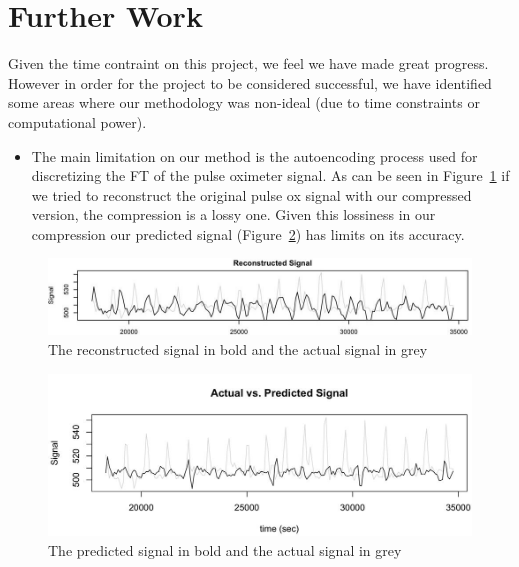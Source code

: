 \documentclass[12pt]{article}
\begin{document}
 \section{Further Work}
  Given the time contraint on this project, we feel we have made great progress.
 However in order for the project to be considered successful, we have identified some areas where our methodology was non-ideal (due to time constraints or computational power).
 \begin{itemize}
 \item{The main limitation on our method is the autoencoding process used for discretizing the FT of the pulse oximeter signal. As can be seen in Figure~\ref{figure:reconst} if we tried to reconstruct the original pulse ox signal with our compressed version, the compression is a lossy one. Given this lossiness in our compression our predicted signal (Figure~\ref{figure:pred}) has limits on its accuracy.}

 
 \end{itemize}
 
 \begin{figure}
\captionsetup{justification=centering}
\includegraphics[width=\textwidth]{images/reconst_signal.jpg}
\caption{The reconstructed signal in bold and the actual signal in grey \label{figure:reconst}}
\end{figure}
 \begin{figure}
\captionsetup{justification=centering}
\includegraphics[width=\textwidth]{images/actual_vs_pred_signal.jpg}
\caption{The predicted signal in bold and the actual signal in grey \label{figure:pred}}
\end{figure}


  
\end{document}
